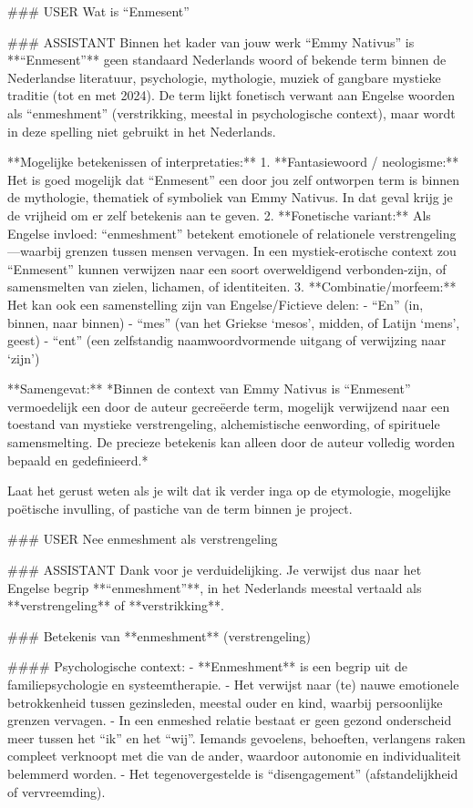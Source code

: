 \#\#\# USER
Wat is “Enmesent”

\#\#\# ASSISTANT
Binnen het kader van jouw werk “Emmy Nativus” is **“Enmesent”** geen standaard Nederlands woord of bekende term binnen de Nederlandse literatuur, psychologie, mythologie, muziek of gangbare mystieke traditie (tot en met 2024). De term lijkt fonetisch verwant aan Engelse woorden als “enmeshment” (verstrikking, meestal in psychologische context), maar wordt in deze spelling niet gebruikt in het Nederlands.

**Mogelijke betekenissen of interpretaties:**
1. **Fantasiewoord / neologisme:** Het is goed mogelijk dat “Enmesent” een door jou zelf ontworpen term is binnen de mythologie, thematiek of symboliek van Emmy Nativus. In dat geval krijg je de vrijheid om er zelf betekenis aan te geven.
2. **Fonetische variant:** Als Engelse invloed: “enmeshment” betekent emotionele of relationele verstrengeling—waarbij grenzen tussen mensen vervagen. In een mystiek-erotische context zou “Enmesent” kunnen verwijzen naar een soort overweldigend verbonden-zijn, of samensmelten van zielen, lichamen, of identiteiten.
3. **Combinatie/morfeem:** Het kan ook een samenstelling zijn van Engelse/Fictieve delen:
- “En” (in, binnen, naar binnen)
- “mes” (van het Griekse ‘mesos’, midden, of Latijn ‘mens’, geest)
- “ent” (een zelfstandig naamwoordvormende uitgang of verwijzing naar ‘zijn’)

**Samengevat:**
*Binnen de context van Emmy Nativus is “Enmesent” vermoedelijk een door de auteur gecreëerde term, mogelijk verwijzend naar een toestand van mystieke verstrengeling, alchemistische eenwording, of spirituele samensmelting. De precieze betekenis kan alleen door de auteur volledig worden bepaald en gedefinieerd.*

Laat het gerust weten als je wilt dat ik verder inga op de etymologie, mogelijke poëtische invulling, of pastiche van de term binnen je project.

\#\#\# USER
Nee enmeshment als verstrengeling

\#\#\# ASSISTANT
Dank voor je verduidelijking. Je verwijst dus naar het Engelse begrip **“enmeshment”**, in het Nederlands meestal vertaald als **verstrengeling** of **verstrikking**.

\#\#\# Betekenis van **enmeshment** (verstrengeling)

\#\#\#\# Psychologische context:
- **Enmeshment** is een begrip uit de familiepsychologie en systeemtherapie.
- Het verwijst naar (te) nauwe emotionele betrokkenheid tussen gezinsleden, meestal ouder en kind, waarbij persoonlijke grenzen vervagen.
- In een enmeshed relatie bestaat er geen gezond onderscheid meer tussen het “ik” en het “wij”. Iemands gevoelens, behoeften, verlangens raken compleet verknoopt met die van de ander, waardoor autonomie en individualiteit belemmerd worden.
- Het tegenovergestelde is “disengagement” (afstandelijkheid of vervreemding).

